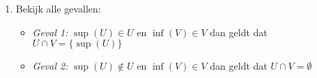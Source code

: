 \documentclass{article}
\newcommand{\f}[2]{\frac{#1}{#2}}
\newcommand{\tx}[1]{\text{#1}}
\newcommand{\en}{\tx{ en }}
\begin{document}
\begin{enumerate}[label=\arabic*]
\begin{enumerate}[label=\alph*)]
\begin{enumerate}
\begin{itemize}
\begin{proof}
                                                      Stel nu dat $p$ een bovengrens is met $p < s$, en neem $\epsilon > 0$ dan:
                                                      \begin{align*}
                                                            p + \epsilon & = 3            \\
                                                            p            & = 3 - \epsilon
                                                      \end{align*}
                                                      Neem nu $z \in Z$ waarbij we $z:= \f{p + 3}{2}$ dan:
                                                      \begin{align*}
                                                            z & = \f{p+3}{2}                     \\
                                                              & = \f{p}{2} + \f{3}{2}            \\
                                                              & = \f{3 - \epsilon}{2} + \f{3}{2} \\
                                                              & = 3 - \f{\epsilon}{2}
                                                      \end{align*}
                                                      Hieruit volgt $p < z < 3$. Dit is een tegenspraak
                                                      want $z \in Z$ en $p < z$, en dus kan $p$ geen bovengrens zijn.
                                                      Dit betekent dus dat $s = 3$.
                                                \end{proof}
                                    \end{itemize}
                        \end{enumerate}
                  \item Vanuit vraag a) heeft $Z$ dus een infimum $i = 0$ waarvoor $0 \in X$ en ook
                        voor $Y$ een supremum $s = 2$ waarbij $2 \in Y$. $X$ heeft dus een minimum en $Y$ een maximum.
            \end{enumerate}
      \item Bekijk alle gevallen:
            \begin{itemize}
                  \item \emph{Geval 1:} $\sup(U) \in U \en \inf(V) \in V$ dan geldt dat $U \cap V = \{\sup(U)\}$
                  \item \emph{Geval 2:} $\sup(U) \notin U \en \inf(V) \in V$ dan geldt dat $U \cap V = \emptyset$

\end{itemize}
\end{enumerate}
\end{document}
